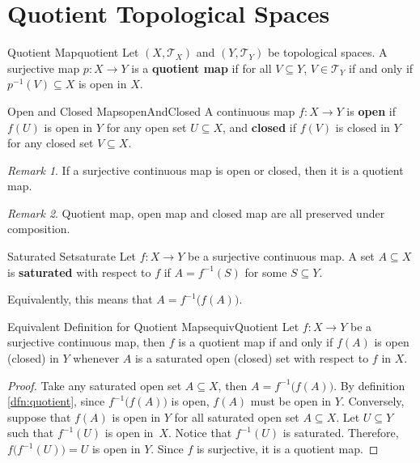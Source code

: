 \documentclass[math]{amznotes}
\theoremstyle{remark}
\newtheorem*{remark}{Remark}
\begin{document}
\section{Quotient Topological Spaces}
\begin{dfnbox}{Quotient Map}{quotient}
    Let $\left(X, \mathcal{T}_X\right)$ and $\left(Y, \mathcal{T}_Y\right)$ be topological spaces. A surjective map $p \colon X \to Y$ is a {\color{red} \textbf{quotient map}} if for all $V \subseteq Y$, $V \in \mathcal{T}_Y$ if and only if $p^{-1}\left(V\right) \subseteq X$ is open in $X$.
\end{dfnbox}
\begin{dfnbox}{Open and Closed Maps}{openAndClosed}
    A continuous map $f \colon X \to Y$ is {\color{red} \textbf{open}} if $f\left(U\right)$ is open in $Y$ for any open set $U \subseteq X$, and {\color{red} \textbf{closed}} if $f\left(V\right)$ is closed in $Y$ for any closed set $V \subseteq X$.
\end{dfnbox}
\begin{notebox}
    \begin{remark}
        If a surjective continuous map is open or closed, then it is a quotient map.
    \end{remark}
\end{notebox}
\begin{notebox}
    \begin{remark}
        Quotient map, open map and closed map are all preserved under composition.
    \end{remark}
\end{notebox}
\begin{dfnbox}{Saturated Set}{saturate}
    Let $f \colon X \to Y$ be a surjective continuous map. A set $A \subseteq X$ is {\color{red} \textbf{saturated}} with respect to $f$ if $A = f^{-1}\left(S\right)$ for some $S \subseteq Y$.
\end{dfnbox}
Equivalently, this means that $A = f^{-1}\bigl(f\left(A\right)\bigr)$.
\begin{probox}{Equivalent Definition for Quotient Maps}{equivQuotient}
    Let $f \colon X \to Y$ be a surjective continuous map, then $f$ is a quotient map if and only if $f\left(A\right)$ is open (closed) in $Y$ whenever $A$ is a saturated open (closed) set with respect to $f$ in $X$.
    \tcblower
    \begin{proof}
        Take any saturated open set $A \subseteq X$, then $A = f^{-1}\bigl(f\left(A\right)\bigr)$. By definition \ref{dfn:quotient}, since $f^{-1}\bigl(f\left(A\right)\bigr)$ is open, $f\left(A\right)$ must be open in $Y$. Conversely, suppose that $f\left(A\right)$ is open in $Y$ for all saturated open set $A \subseteq X$. Let $U \subseteq Y$ such that $f^{-1}\left(U\right)$ is open in~$X$. Notice that $f^{-1}\left(U\right)$ is saturated. Therefore, $f\bigl(f^{-1}\left(U\right)\bigr) = U$ is open in $Y$. Since $f$ is surjective, it is a quotient map.
    \end{proof}
\end{probox}
\end{document}
